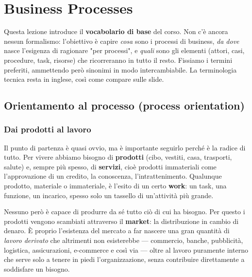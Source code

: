 \chapter{\texorpdfstring{Business Processes}{Business Processes}}
\label{ch:02}

Questa lezione introduce il \textbf{vocabolario di base} del corso. Non c'è ancora nessun formalismo: l'obiettivo è capire \emph{cosa} sono i processi di business, \emph{da dove} nasce l'esigenza di ragionare "per processi", e \emph{quali} sono gli elementi (attori, casi, procedure, task, risorse) che ricorreranno in tutto il resto. Fissiamo i termini preferiti, ammettendo però sinonimi in modo intercambiabile. La terminologia tecnica resta in inglese, così come compare sulle slide.

\section{\texorpdfstring{Orientamento al processo (process orientation)}{Orientamento al processo (process orientation)}}

\subsection{\texorpdfstring{Dai prodotti al lavoro}{Dai prodotti al lavoro}}

Il punto di partenza è quasi ovvio, ma è importante seguirlo perché è la radice di tutto. Per vivere abbiamo bisogno di \textbf{prodotti} (cibo, vestiti, casa, trasporti, salute) e, sempre più spesso, di \textbf{servizi}, cioè prodotti immateriali come l'approvazione di un credito, la conoscenza, l'intrattenimento. Qualunque prodotto, materiale o immateriale, è l'esito di un certo \textbf{work}: un task, una funzione, un incarico, spesso solo un tassello di un'attività più grande.

Nessuno però è capace di produrre da sé tutto ciò di cui ha bisogno. Per questo i prodotti vengono scambiati attraverso il \textbf{market}: la distribuzione in cambio di denaro. È proprio l'esistenza del mercato a far nascere una gran quantità di \emph{lavoro derivato} che altrimenti non esisterebbe — commercio, banche, pubblicità, logistica, assicurazioni, e-commerce e così via — oltre al lavoro puramente interno che serve solo a tenere in piedi l'organizzazione, senza contribuire direttamente a soddisfare un bisogno.

